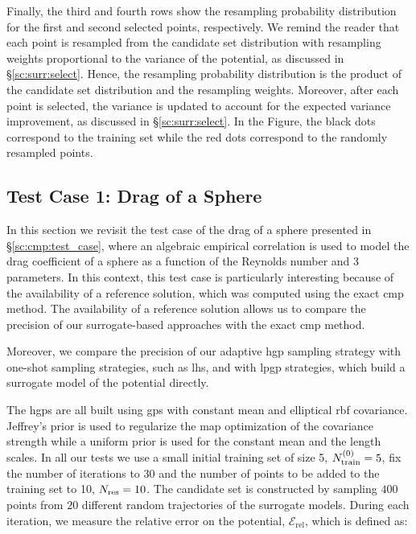 \smallskip
Finally, the third and fourth rows show the resampling probability distribution for the first and second selected points, respectively. We remind the reader that each point is resampled from the candidate set distribution with resampling weights proportional to the variance of the potential, as discussed in \S\ref{sc:surr:select}. Hence, the resampling probability distribution is the product of the candidate set distribution and the resampling weights. Moreover, after each point is selected, the variance is updated to account for the expected variance improvement, as discussed in \S\ref{sc:surr:select}. In the Figure, the black dots correspond to the training set while the red dots correspond to the randomly resampled points.

\subsection{Test Case 1: Drag of a Sphere}
\label{sc:tc1}

In this section we revisit the test case of the drag of a sphere presented in \S\ref{sc:cmp:test_case}, where an algebraic empirical correlation is used to model the drag coefficient of a sphere as a function of the Reynolds number and 3 parameters. In this context, this test case is particularly interesting because of the availability of a reference solution, which was computed using the exact \gls{cmp} method. The availability of a reference solution allows us to compare the precision of our surrogate-based approaches with the exact \gls{cmp} method.

\smallskip
Moreover, we compare the precision of our adaptive \gls{hgp} sampling strategy with one-shot sampling strategies, such as \gls{lhs}, and with \gls{lpgp} strategies, which build a surrogate model of the potential directly. 

\bigskip
The \glspl{hgp} are all built using \glspl{gp} with constant mean and elliptical \gls{rbf} covariance. Jeffrey's prior is used to regularize the \gls{map} optimization of the covariance strength while a uniform prior is used for the constant mean and the length scales. In all our tests we use a small initial training set of size 5, $N_{\mathrm{train}}^{(0)}=5$, fix the number of iterations to $30$ and the number of points to be added to the training set to 10, ${N_{\mathrm{res}}}=10$. The candidate set is constructed by sampling $400$ points from $20$ different random trajectories of the surrogate models. During each iteration, we measure the relative error on the potential, $\mathcal{E}_{\mathrm{rel}}$, which is defined as:

